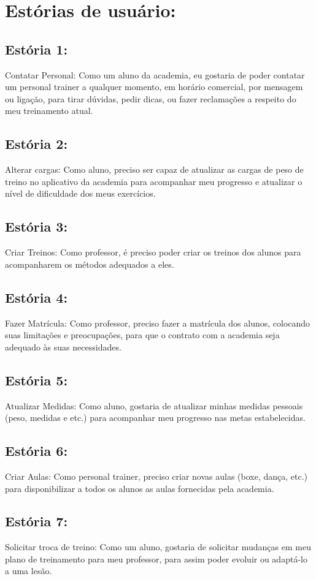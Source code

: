 \documentclass{article}
\begin{document}
\section{Estórias de usuário: }

\subsection{Estória 1: }
    Contatar Personal:  Como um aluno da academia, eu gostaria de poder contatar um personal trainer a qualquer momento, em horário comercial, por mensagem ou ligação, para tirar dúvidas, pedir dicas, ou fazer reclamações a respeito do meu treinamento atual.
\subsection{Estória 2: }
    Alterar cargas: Como aluno, preciso ser capaz de atualizar as cargas de peso de treino no aplicativo da academia para acompanhar meu progresso e atualizar o nível de dificuldade dos meus exercícios.
\subsection{Estória 3: }
    Criar Treinos: Como professor, é preciso poder criar os treinos dos alunos para acompanharem os métodos adequados a eles.
\subsection{Estória 4: }
    Fazer Matrícula: Como professor, preciso fazer a matrícula dos alunos,  colocando suas limitações e preocupações, para que o contrato com a academia seja adequado às suas necessidades. 
\subsection{Estória 5: }
    Atualizar Medidas: Como aluno, gostaria de atualizar minhas medidas pessoais (peso, medidas e etc.) para acompanhar meu progresso nas metas estabelecidas.
\subsection{Estória 6: }
    Criar Aulas: Como personal trainer, preciso criar novas aulas (boxe, dança, etc.) para disponibilizar a todos os alunos as aulas fornecidas pela academia.
\subsection{Estória 7: }
    Solicitar troca de treino: Como um aluno, gostaria de solicitar mudanças em meu plano de treinamento para meu professor, para assim poder evoluir ou adaptá-lo a uma lesão.
\end{document}

